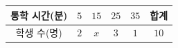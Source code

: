 {\renewcommand{\arraystretch}{1.35}\small
\begin{tabular}{|c|c|c|c|c|c|}
\hline
통학 시간(분) & $5$ & $15$ & $25$ & $35$ & 합계 \\ \hline
학생 수(명) & $2$ & $x$ & $3$ & $1$ & $10$ \\ \hline
\end{tabular}}
